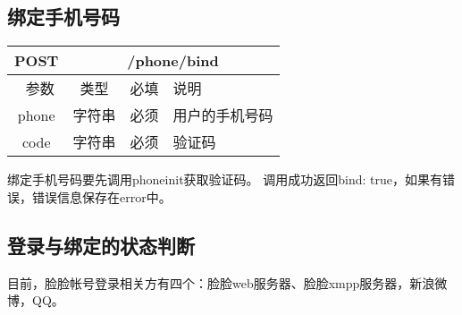 \subsection{绑定手机号码}
\label{hash_algorithm}

\begin{table}[H]
   \begin{center}
\begin{tabular}{|c|c|c|p{12cm}|}
\hline
POST & \multicolumn{3}{|c|}{/phone/bind} \\
\hline\hline
 \  参数  & 类型 & 必填 &  说明  \\
\hline
 phone  & 字符串 & 必须 &  用户的手机号码\\
\hline
 code  & 字符串 & 必须 &  验证码\\
\hline
\end{tabular}
   \end{center}
\end{table}

绑定手机号码要先调用phone\/init获取验证码。
调用成功返回{bind: true}，如果有错误，错误信息保存在error中。



\subsection{登录与绑定的状态判断}
目前，脸脸帐号登录相关方有四个：脸脸web服务器、脸脸xmpp服务器，新浪微博，QQ。

